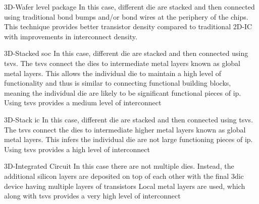 \begin{outline}

  \1 3D-Wafer level package \cite{itrs2015_interconn}
    \2 In this case, different die are stacked and then connected using traditional bond bumps and/or bond wires at the periphery of the chips.
    \2 This technique provides better transistor density compared to traditional 2D-IC with improvements in interconnect density.

  \1 3D-Stacked \ac{soc} \cite{itrs2015_interconn}
    \2 In this case, different die are stacked and then connected using \acp{tsv}. The \acp{tsv} connect the dies to intermediate metal layers known as global metal layers. This allows the individual die to maintain a high level of functionality and thus is similar to connecting functional building blocks, meaning the individual die are likely to be significant functional pieces of \ac{ip}.
    \2 Using \acp{tsv} provides a medium level of interconnect

  \1 3D-Stack \ac{ic} \cite{itrs2015_interconn}
    \2 In this case, different die are stacked and then connected using \acp{tsv}. The \acp{tsv} connect the dies to intermediate higher metal layers known as global metal layers. This infers the individual die are not large functioning pieces of \ac{ip}.
    \2 Using \acp{tsv} provides a high level of interconnect

  \1 3D-Integrated Circuit \cite{itrs2015_interconn}
    \2 In this case there are not multiple dies. Instead, the additional silicon layers are deposited on top of each other with the final \ac{3dic} device having multiple layers of transistors
    \2 Local metal layers are used, which along with \acp{tsv} provides a very high level of interconnect
\end{outline}

